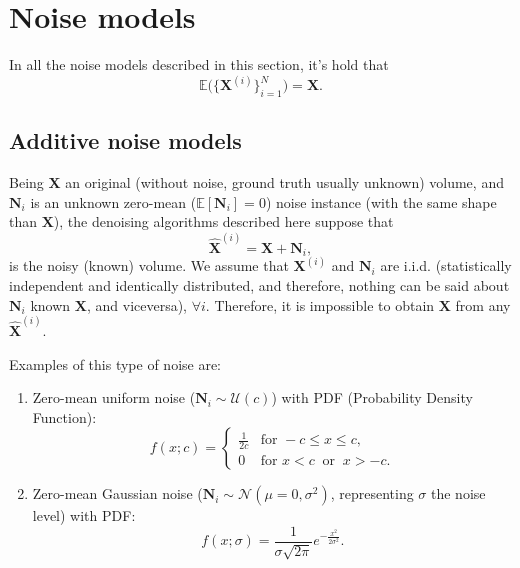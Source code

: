 \documentclass{article}
\begin{document}
\section{Noise models}

In all the noise models described in this section, it's hold that
\begin{equation}
  {\mathbb E}\big(\{{\mathbf X}^{(i)}\}_{i=1}^N\big)={\mathbf X}.
\end{equation}

\subsection{Additive noise models}

Being $\mathbf{X}$ an original (without noise, ground truth usually
unknown) volume, and ${\mathbf N}_i$ is an unknown zero-mean
($\mathbb{E}[{\mathbf N}_i]=0$) noise instance (with the same shape than
${\mathbf X}$), the denoising algorithms described here suppose that
\begin{equation}
  \hat{\mathbf X}^{(i)} = {\mathbf X} + {\mathbf N}_i,
  \label{eq:noisy_model}
\end{equation}
is the noisy (known) volume. We assume that ${\mathbf X}^{(i)}$ and
$\mathbf{N}_i$ are i.i.d. (statistically independent and identically
distributed, and therefore, nothing can be said about ${\mathbf N}_i$
known ${\mathbf X}$, and viceversa), $\forall i$. Therefore, it is
impossible to obtain ${\mathbf X}$ from any $\hat{\mathbf X}^{(i)}$.

Examples of this type of noise are:
\begin{enumerate}
\item Zero-mean uniform noise ($\mathbf{N}_i\sim\mathcal{U}(c)$) with
  PDF (Probability Density Function):
  \begin{equation}
    f(x; c) = \begin{cases}
      \frac{1}{2c} & \text{for } -c \le x \le c, \\[8pt]
      0 & \text{for } x < c \ \text{ or } \ x > -c.
    \end{cases}
  \end{equation}
\item Zero-mean Gaussian noise
  ($\mathbf{N}_i\sim\mathcal{N}(\mu=0,\sigma^2)$, representing
  $\sigma$ the noise level) with PDF:
  \begin{equation}
    f(x; \sigma) = \frac 1 {\sigma\sqrt{2\pi}} e^{-\frac{x^2}{2\sigma^2} }.
  \end{equation}
\end{enumerate}
\end{document}
